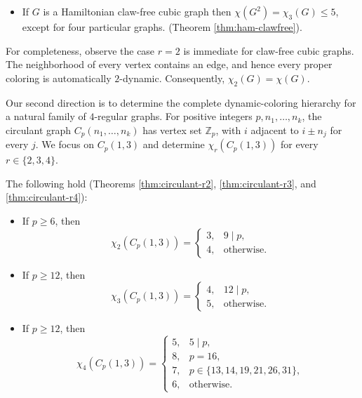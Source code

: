 \documentclass[10pt,a4paper]{article}
\newtheorem{theorem}             {Theorem}
\theoremstyle{case}
\numberwithin{subcase}{case}
\begin{document}

\begin{itemize}
    \item If $G$ is a Hamiltonian claw-free cubic graph then
$
\chi(G^2)=\chi_3(G)\le5$, except
for four particular graphs. (Theorem \ref{thm:ham-clawfree}).
\end{itemize}

For completeness, observe the case $r=2$ is immediate for claw-free cubic graphs. The neighborhood of every vertex contains an edge, and hence
every proper coloring is automatically $2$-dynamic. Consequently,
$
\chi_2(G)=\chi(G).
$

Our second direction is to determine the complete dynamic-coloring
hierarchy for a natural family of $4$-regular graphs. For positive
integers $p,n_1,\ldots,n_k$, the circulant graph
$C_p(n_1,\ldots,n_k)$ has vertex set $\mathbb Z_p$, with $i$ adjacent
to $i\pm n_j$ for every $j$. We focus on $C_p(1,3)$ and determine
$\chi_r(C_p(1,3))$ for every $r\in\{2,3,4\}$.

The following hold (Theorems
\ref{thm:circulant-r2},     
\ref{thm:circulant-r3}, and \ref{thm:circulant-r4}):
\begin{itemize}
 \item If $p\ge6$, then
\[
\chi_2(C_p(1,3))=
\begin{cases}
3,&9\mid p,\\
4,&\text{otherwise}.
\end{cases}
\]

\item If $p\ge12$, then
\[
\chi_3(C_p(1,3))=
\begin{cases}
4,&12\mid p,\\
5,&\text{otherwise}.
\end{cases}
\]

\item If $p\ge12$, then
\[
\chi_4(C_p(1,3))=
\begin{cases}
5,&5\mid p,\\
8,&p=16,\\
7,&p\in\{13,14,19,21,26,31\},\\
6,&\text{otherwise}.
\end{cases}
\]
\end{itemize}
\end{document}
